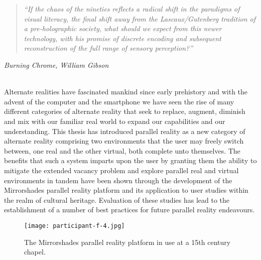 


\begin{quote}
	\textit{``If the chaos of the nineties reflects a radical shift in the paradigms of visual literacy, the final shift away from the Lascaux/Gutenberg tradition of a pre-holographic society, what should we expect from this newer technology, with his promise of discrete encoding and subsequent reconstruction of the full range of sensory perception?''}
\end{quote}
\hfill \textit{Burning Chrome, William Gibson}
\\
\\


\label{chapter-conclusions}

Alternate realities have fascinated mankind since early prehistory and with the advent of the computer and the smartphone we have seen the rise of many different categories of alternate reality that seek to replace, augment, diminish and mix with our familiar real world to expand our capabilities and our understanding. This thesis has introduced parallel reality as a new category of alternate reality comprising two environments that the user may freely switch between, one real and the other virtual, both complete unto themselves. The benefits that such a system imparts upon the user by granting them the ability to mitigate the extended vacancy problem and explore parallel real and virtual environments in tandem have been shown through the development of the Mirrorshades parallel reality platform and its application to user studies within the realm of cultural heritage. Evaluation of these studies has lead to the establishment of a number of best practices for future parallel reality endeavours.

\begin{figure}[t]
	\begin{center}
		\texttt{[image: participant-f-4.jpg]}
		\caption{The Mirrorshades parallel reality platform in use at a 15th century chapel.}
		\label{participant-f-4.jpg}
	\end{center}	
\end{figure}

